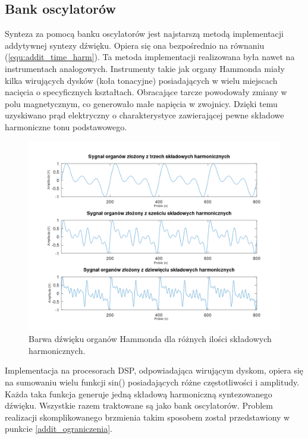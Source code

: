 \subsection{Bank oscylatorów}
Synteza za pomocą banku oscylatorów jest najstarszą metodą implementacji addytywnej syntezy dźwięku. Opiera się ona bezpośrednio na równaniu (\ref{equ:addit_time_harm}).
Ta metoda implementacji realizowana była nawet na instrumentach analogowych. Instrumenty takie jak organy Hammonda miały kilka wirujących dysków (koła tonacyjne) posiadających w wielu miejscach nacięcia o specyficznych kształtach. Obracające tarcze powodowały zmiany w polu magnetycznym, co generowało małe napięcia w zwojnicy. Dzięki temu uzyskiwano prąd elektryczny o charakterystyce zawierającej pewne składowe harmoniczne tonu podstawowego.
\begin{figure}[H]
	\centering
	\includegraphics[width=15cm]{grafiki/add_hammond_matlab}
	\captionsetup{justification=centering}
	\caption{Barwa dźwięku organów Hammonda dla różnych ilości składowych harmonicznych.}
	\label{rys:add_hammond_matlab}
\end{figure}

Implementacja na procesorach DSP, odpowiadająca wirującym dyskom, opiera się na sumowaniu wielu funkcji sin() posiadających różne częstotliwości i amplitudy. Każda taka funkcja generuje jedną składową harmoniczną syntezowanego dźwięku. Wszystkie razem traktowane są jako bank oscylatorów. Problem realizacji skomplikowanego brzmienia takim sposobem został przedstawiony w punkcie \ref{addit_ograniczenia}.

